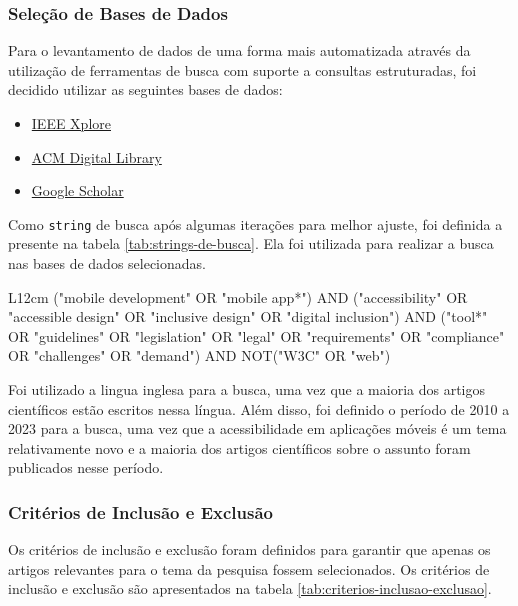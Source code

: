 \subsubsection{Seleção de Bases de Dados}

Para o levantamento de dados de uma forma mais automatizada através da utilização de ferramentas de busca com suporte a consultas estruturadas, foi decidido utilizar as seguintes bases de dados:

\begin{itemize}
	\item \href{https://ieeexplore.ieee.org/}{IEEE Xplore}
	\item \href{https://dl.acm.org/}{ACM Digital Library}
	\item \href{https://scholar.google.com/}{Google Scholar}
\end{itemize}

Como \texttt{string} de busca após algumas iterações para melhor ajuste, foi definida a presente na tabela \ref{tab:strings-de-busca}. Ela foi utilizada para realizar a busca nas bases de dados selecionadas.

\begin{table}[!htbp]
	\centering
	\renewcommand{\arraystretch}{1.1}
	\caption{Strings de busca}
	\label{tab:strings-de-busca}
	\begin{tabular}{ L{12cm} }
		\hline
		("mobile development" OR "mobile app*") AND ("accessibility" OR "accessible design" OR "inclusive design" OR "digital inclusion") AND ("tool*" OR "guidelines" OR "legislation" OR "legal" OR "requirements" OR "compliance" OR "challenges" OR "demand") AND NOT("W3C" OR "web") \\
		\hline
	\end{tabular}
	\vspace{2mm}
\end{table}

Foi utilizado a lingua inglesa para a busca, uma vez que a maioria dos artigos científicos estão escritos nessa língua. Além disso, foi definido o período de 2010 a 2023 para a busca, uma vez que a acessibilidade em aplicações móveis é um tema relativamente novo e a maioria dos artigos científicos sobre o assunto foram publicados nesse período.

\subsubsection{Critérios de Inclusão e Exclusão}

Os critérios de inclusão e exclusão foram definidos para garantir que apenas os artigos relevantes para o tema da pesquisa fossem selecionados. Os critérios de inclusão e exclusão são apresentados na tabela \ref{tab:criterios-inclusao-exclusao}.

